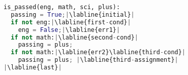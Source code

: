 \begin{lstlisting}[language=Python,escapechar=|,style=mystyle]
is_passed(eng, math, sci, plus):
  passing = True;|\labline{initial}|
  if not eng:|\labline{first-cond}|
    eng = False;|\labline{err1}|
  if not math:|\labline{second-cond}|
    passing = plus;
  if not math:|\labline{err2}\labline{third-cond}|
    passing = plus; |\labline{third-assignment}|
|\labline{last}|
\end{lstlisting}
